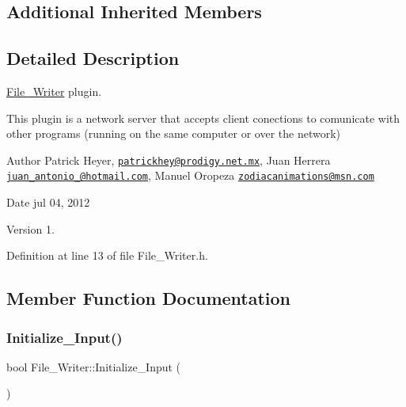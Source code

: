 \subsection*{Additional Inherited Members}


\subsection{Detailed Description}
\hyperlink{class_file___writer}{File\+\_\+\+Writer} plugin. 

This plugin is a network server that accepts client conections to comunicate with other programs (running on the same computer or over the network) \begin{DoxyAuthor}{Author}
Patrick Heyer, \href{mailto:patrickhey@prodigy.net.mx}{\tt patrickhey@prodigy.\+net.\+mx}, Juan Herrera \href{mailto:juan_antonio_@hotmail.com}{\tt juan\+\_\+antonio\+\_\+@hotmail.\+com}, Manuel Oropeza \href{mailto:zodiacanimations@msn.com}{\tt zodiacanimations@msn.\+com} 
\end{DoxyAuthor}
\begin{DoxyDate}{Date}
jul 04, 2012 
\end{DoxyDate}
\begin{DoxyVersion}{Version}
1. 
\end{DoxyVersion}


Definition at line 13 of file File\+\_\+\+Writer.\+h.



\subsection{Member Function Documentation}
\mbox{\label{class_file___writer_a13697d8b3249804553ef61a54fea5ce1}} 
\subsubsection{\texorpdfstring{Initialize\+\_\+\+Input()}{Initialize\_Input()}}
{\footnotesize\ttfamily bool File\+\_\+\+Writer\+::\+Initialize\+\_\+\+Input (\begin{DoxyParamCaption}{ }\end{DoxyParamCaption})\hspace{0.3cm}{\ttfamily [virtual]}}



